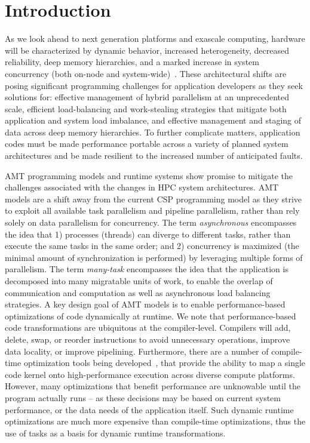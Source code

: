 \chapter{Introduction}
\label{chap:introduction}
As we look ahead to next generation platforms and exascale computing, hardware 
will be characterized by dynamic behavior, increased
heterogeneity, decreased reliability, deep memory hierarchies, and a marked increase in system
\gls{concurrency} (both on-node and system-wide)~\cite{doe_arch, dav_exascale}. 
These architectural shifts are posing significant programming challenges for
application developers as they seek solutions for: effective management of hybrid parallelism 
at an unprecedented scale,  efficient load-balancing and work-stealing
strategies that mitigate both application and system load imbalance, and effective management and
staging of data across deep memory hierarchies.  To further complicate matters,
application codes must be made performance portable across a variety of planned
system architectures and be made resilient to the increased number of anticipated faults.  

\gls{AMT} \glspl{programming model} and \glspl{runtime system} 
show promise to mitigate the challenges associated with the changes in \gls{HPC} system architectures.  
\gls{AMT} models are a shift away from the current \gls{CSP} \gls{programming model} 
as they strive to exploit all available \gls{task parallelism} and
\gls{pipeline parallelism}, rather than rely solely on \gls{data parallelism}
for \gls{concurrency}. The term {\em \gls{asynchronous}} encompasses the idea that 
1) processes (threads) can diverge to different tasks, rather than execute 
the same tasks in the same order; and 2) \gls{concurrency} is maximized (the 
  minimal amount of synchronization is performed) by 
leveraging multiple forms of parallelism. The term {\em many-task} encompasses 
the idea that the application is decomposed into many 
\gls{migratable} units of work, to enable the overlap of communication and 
computation as well as asynchronous load balancing strategies.
A key design goal of \gls{AMT} models is to enable performance-based
optimizations of code dynamically at runtime.
We note that performance-based code transformations are ubiquitous at the compiler-level.
Compilers will add, delete, swap, or reorder instructions to avoid unnecessary operations, improve data locality, or improve pipelining.
Furthermore, there are a number of compile-time optimization tools being
developed~\cite{Kokkos,RAJA}, that provide the ability to map a
single code kernel onto high-performance execution across diverse compute platforms.
However, many optimizations that benefit performance are unknowable until the program
actually runs -- as these decisions may be based on current system performance,
or the data needs of the application itself. Such dynamic runtime optimizations are much more expensive 
than compile-time optimizations, thus the use of \glspl{task} as a basis
for dynamic runtime transformations.

